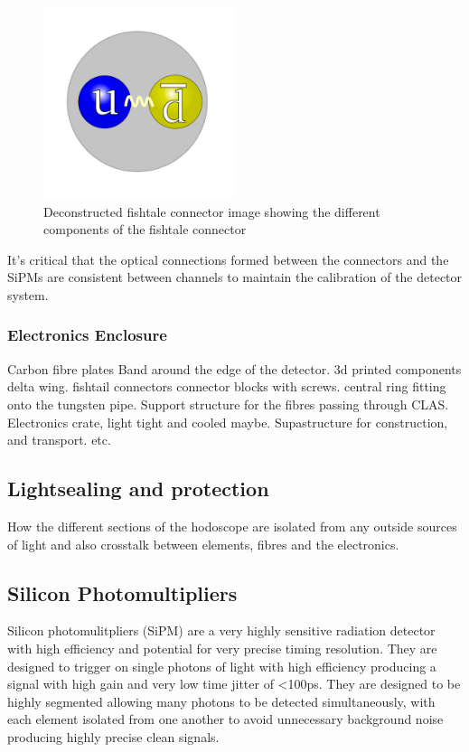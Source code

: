 \begin{figure}[!ht]
	\centering
	\includegraphics[width=0.5\textwidth]{ImgChap1/Meson2}
	\caption{Deconstructed fishtale connector image showing the different components of the fishtale connector}
	\label{FishtaleDeconstructed}
\end{figure}

It's critical that the optical connections formed between the connectors and the SiPMs are consistent between channels to maintain the calibration of the detector system.

\subsubsection*{Electronics Enclosure}

Carbon fibre plates
Band around the edge of the detector.
3d printed components
delta wing.
fishtail connectors
connector blocks with screws.
central ring fitting onto the tungsten pipe.
Support structure for the fibres passing through CLAS.
Electronics crate, light tight and cooled maybe.
Supastructure for construction, and transport.
etc.

\subsection{Lightsealing and protection}
How the different sections of the hodoscope are isolated from any outside sources of light and also crosstalk between elements, fibres and the electronics.


\subsection{Silicon Photomultipliers}

Silicon photomulitpliers (SiPM) are a very highly sensitive radiation detector with high efficiency and potential for very precise timing resolution. They are designed to trigger on single photons of light with high efficiency producing a signal with high gain and very low time jitter of <100ps. They are designed to be highly segmented allowing many photons to be detected simultaneously, with each element isolated from one another to avoid unnecessary background noise producing highly precise clean signals.

